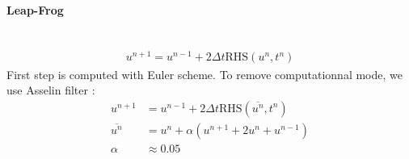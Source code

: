 \documentclass[12pt]{article}
\numberwithin{equation}{section}%
\begin{document}
\paragraph{Leap-Frog}~\\
\begin{align}
	u^{n+1} = u^{n-1}+2\Delta t \mathrm{RHS}(u^n, t^n)
\end{align}
First step is computed with Euler scheme. To remove computationnal mode, we use Asselin filter : 
\begin{align}
	u^{n+1} &= u^{n-1}+2\Delta t \mathrm{RHS}(\overline{u^n}, t^n)\\
	\overline{u^n} &= u^{n} + \alpha(u^{n+1}+2u^n+u^{n-1})\\
	\alpha &\approx 0.05
\end{align}

\printbibliography
\end{document}
